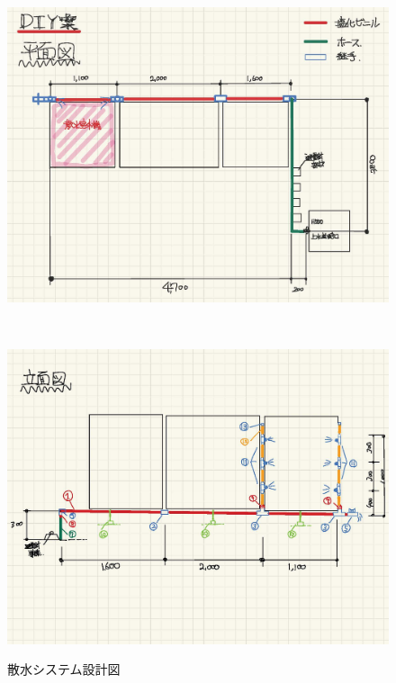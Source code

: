 \documentclass[a4j,fleqn,dvipdfmx,uplatex]{jsarticle}
\begin{document}
\begin{figure}[hhtb]
  \centering
    \begin{minipage}[b]{\linewidth}
      \centering
      \includegraphics[width=\linewidth]{img/平面図.jpg}
      \label{subfig:平面図}
    \end{minipage}\\
    \begin{minipage}[b]{\linewidth}
      \centering
      \includegraphics[width=\linewidth]{img/裏手立面図.jpg}
      \label{subfig:裏手立面図}
    \end{minipage}
  \caption{散水システム設計図}
  \label{fig2:watering_sys}
\end{figure}
\end{document}
